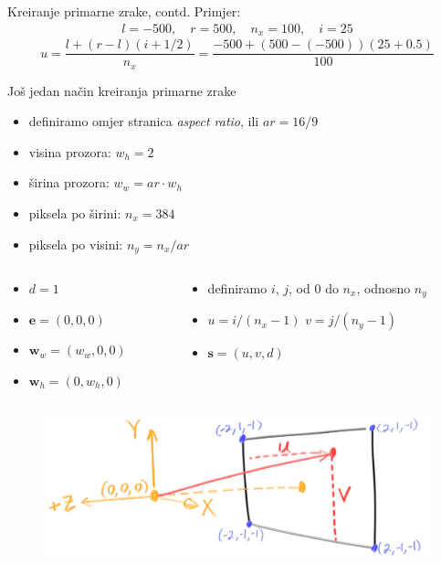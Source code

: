 \documentclass[9pt]{beamer}
\begin{document}
\begin{frame}{Kreiranje primarne zrake, contd.}
Primjer:
\begin{align*}
l = -500, \quad r = 500, \quad n_x = 100, \quad i=25
\end{align*}
$$
u = \frac{l + (r-l)(i+1/2)}{n_x} = \frac{-500 + (500- (-500))(25+0.5)}{100}
$$
\end{frame}

\begin{frame}{Još jedan način kreiranja primarne zrake}
\begin{itemize}
	\item definiramo omjer stranica \textit{aspect ratio}, ili $ar = 16/9$
	\item visina prozora: $w_h = 2$
	\item širina prozora: $w_w = ar\cdot w_h$
	\item piksela po širini: $n_x = 384$
	\item piksela po visini: $n_y = n_x/ar$
\end{itemize}
\begin{columns}
	\begin{column}{0.5\linewidth}
		\begin{itemize}
			\item $d = 1$
			\item $\textbf{e}= (0, 0, 0)$
			\item $\textbf{w}_w= (w_w, 0, 0)$
			\item $\textbf{w}_h= (0, w_h, 0)$
		\end{itemize}
	\end{column}
	\begin{column}{0.5\linewidth}
		\begin{itemize}
			\item definiramo $i$, $j$, od $0$ do $n_x$, odnosno $n_y$
			\item $u= i/(n_x-1)$ \quad  $v= j/(n_y-1)$
			\item $\textbf{s} = (u, v, d)$
		\end{itemize}
	\end{column}
\end{columns}

\begin{figure}
	\includegraphics[width=0.5\linewidth]{./slike/fig-cam-geom.png}
\end{figure}
\end{frame}
\end{document}
